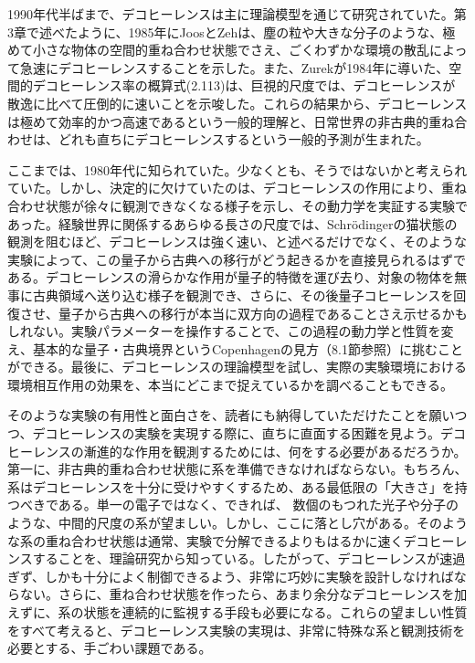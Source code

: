 \hypertarget{srcpage:243}{}\label{srcpage:243}
\setcounter{footnote}{0}
1990年代半ばまで、デコヒーレンスは主に理論模型を通じて研究されていた。第3章で述べたように、1985年にJoosとZeh\cite{ref007}は、塵の粒や大きな分子のような、極めて小さな物体の空間的重ね合わせ状態でさえ、ごくわずかな環境の散乱によって急速にデコヒーレンスすることを示した。また、Zurekが1984年に導いた、空間的デコヒーレンス率の概算式(2.113)\cite{ref012}は、巨視的尺度では、デコヒーレンスが散逸に比べて圧倒的に速いことを示唆した。これらの結果から、デコヒーレンスは極めて効率的かつ高速であるという一般的理解と、日常世界の非古典的重ね合わせは、どれも直ちにデコヒーレンスするという一般的予測が生まれた。

ここまでは、1980年代に知られていた。少なくとも、そうではないかと考えられていた。しかし、決定的に欠けていたのは、デコヒーレンスの作用により、重ね合わせ状態が徐々に観測できなくなる様子を示し、その動力学を実証する実験であった。経験世界に関係するあらゆる長さの尺度では、Schrödingerの猫状態の観測を阻むほど、デコヒーレンスは強く速い、と述べるだけでなく、そのような実験によって、この量子から古典への移行がどう起きるかを直接見られるはずである。デコヒーレンスの滑らかな作用が量子的特徴を運び去り、対象の物体を無事に古典領域へ送り込む様子を観測でき、さらに、その後量子コヒーレンスを回復させ、量子から古典への移行が本当に双方向の過程であることさえ示せるかもしれない。実験パラメーターを操作することで、この過程の動力学と性質を変え、基本的な量子・古典境界というCopenhagenの見方（8.1節参照）に挑むことができる。最後に、デコヒーレンスの理論模型を試し、実際の実験環境における環境相互作用の効果を、本当にどこまで捉えているかを調べることもできる。

そのような実験の有用性と面白さを、読者にも納得していただけたことを願いつつ、デコヒーレンスの実験を実現する際に、直ちに直面する困難を見よう。デコヒーレンスの漸進的な作用を観測するためには、何をする必要があるだろうか。第一に、非古典的重ね合わせ状態に系を準備できなければならない。もちろん、系はデコヒーレンスを十分に受けやすくするため、ある最低限の「大きさ」を持つべきである。単一の電子ではなく、できれば、
\hypertarget{srcpage:244}{}\label{srcpage:244}
数個のもつれた光子や分子のような、中間的尺度の系が望ましい。しかし、ここに落とし穴がある。そのような系の重ね合わせ状態は通常、実験で分解できるよりもはるかに速くデコヒーレンスすることを、理論研究から知っている。したがって、デコヒーレンスが速過ぎず、しかも十分によく制御できるよう、非常に巧妙に実験を設計しなければならない。さらに、重ね合わせ状態を作ったら、あまり余分なデコヒーレンスを加えずに、系の状態を連続的に監視する手段も必要になる。これらの望ましい性質をすべて考えると、デコヒーレンス実験の実現は、非常に特殊な系と観測技術を必要とする、手ごわい課題である。

